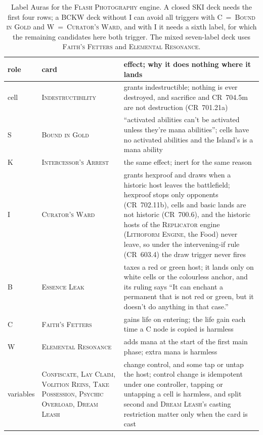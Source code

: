 \documentclass[11pt]{article}
\theoremstyle{definition}
\newcommand{\card}[1]{{\mdseries\scshape #1}}
\newcommand{\CR}[1]{CR~#1}
\begin{document}
\begin{table}[t]
\centering\small
\begin{tabularx}{\textwidth}{@{}l>{\raggedright\arraybackslash}p{3.1cm}>{\raggedright\arraybackslash}X@{}}
\toprule
role & card & effect; why it does nothing where it lands\\
\midrule
cell & \card{Indestructibility} & grants indestructible; nothing is ever destroyed, and sacrifice and \CR{704.5m} are not destruction (\CR{701.21a})\\
S & \card{Bound in Gold} & ``activated abilities can't be activated unless they're mana abilities''; cells have no activated abilities and the Island's is a mana ability\\
K & \card{Intercessor's Arrest} & the same effect; inert for the same reason\\
I & \card{Curator's Ward} & grants hexproof and draws when a historic host leaves the battlefield; hexproof stops only opponents (\CR{702.11b}), cells and basic lands are not historic (\CR{700.6}), and the historic hosts of the \card{Replicator} engine (\card{Lithoform Engine}, the Food) never leave, so under the intervening-if rule (\CR{603.4}) the draw trigger never fires\\
B & \card{Essence Leak} & taxes a red or green host; it lands only on white cells or the colourless anchor, and its ruling says ``It can enchant a permanent that is not red or green, but it doesn't do anything in that case.''\\
C & \card{Faith's Fetters} & gains life on entering; the life gain each time a C node is copied is harmless\\
W & \card{Elemental Resonance} & adds mana at the start of the first main phase; extra mana is harmless\\
variables & \card{Confiscate}, \card{Lay Claim}, \card{Volition Reins}, \card{Take Possession}, \card{Psychic Overload}, \card{Dream Leash} & change control, and some tap or untap the host; control change is idempotent under one controller, tapping or untapping a cell is harmless, and split second and \card{Dream Leash}'s casting restriction matter only when the card is cast\\
\bottomrule
\end{tabularx}
\caption{Label Auras for the \card{Flash Photography} engine. A closed SKI deck needs the first
four rows; a BCKW deck without I can avoid all triggers with C~=~\card{Bound in Gold} and
W~=~\card{Curator's Ward}, and with I it needs a sixth label, for which the remaining
candidates here both trigger. The mixed seven-label deck uses \card{Faith's Fetters} and
\card{Elemental Resonance}.}\label{tab:labels}
\end{table}
\end{document}

